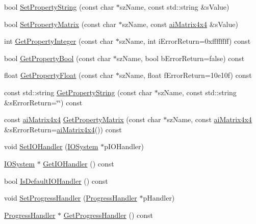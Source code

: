 \begin{DoxyCompactItemize}
\item 
bool \hyperlink{class_assimp_1_1_importer_a854087b213981108e3e464cf4d293fed}{Set\-Property\-String} (const char $\ast$sz\-Name, const std\-::string \&s\-Value)
\item 
bool \hyperlink{class_assimp_1_1_importer_acd128e5fb5777ef238b8bd1454a9c3ad}{Set\-Property\-Matrix} (const char $\ast$sz\-Name, const \hyperlink{structai_matrix4x4}{ai\-Matrix4x4} \&s\-Value)
\item 
int \hyperlink{class_assimp_1_1_importer_a3e796a0758a9f10f13107f44c542ad41}{Get\-Property\-Integer} (const char $\ast$sz\-Name, int i\-Error\-Return=0xffffffff) const 
\item 
bool \hyperlink{class_assimp_1_1_importer_a90f5d35d25e5d2a0ef8bc0c6545b2010}{Get\-Property\-Bool} (const char $\ast$sz\-Name, bool b\-Error\-Return=false) const 
\item 
float \hyperlink{class_assimp_1_1_importer_a9a99a3467d6386ddcfbe2823f16b6640}{Get\-Property\-Float} (const char $\ast$sz\-Name, float f\-Error\-Return=10e10f) const 
\item 
const std\-::string \hyperlink{class_assimp_1_1_importer_aa31cc1aa8f83056fe097b149354ddfd3}{Get\-Property\-String} (const char $\ast$sz\-Name, const std\-::string \&s\-Error\-Return=\char`\"{}\char`\"{}) const 
\item 
const \hyperlink{structai_matrix4x4}{ai\-Matrix4x4} \hyperlink{class_assimp_1_1_importer_a1b2e36eab7155233846b24ec30e7e273}{Get\-Property\-Matrix} (const char $\ast$sz\-Name, const \hyperlink{structai_matrix4x4}{ai\-Matrix4x4} \&s\-Error\-Return=\hyperlink{structai_matrix4x4}{ai\-Matrix4x4}()) const 
\item 
void \hyperlink{class_assimp_1_1_importer_a1161f46318af18bb86dfe0fc3edea4df}{Set\-I\-O\-Handler} (\hyperlink{class_assimp_1_1_i_o_system}{I\-O\-System} $\ast$p\-I\-O\-Handler)
\item 
\hyperlink{class_assimp_1_1_i_o_system}{I\-O\-System} $\ast$ \hyperlink{class_assimp_1_1_importer_abe3af30f4c5eae2e875b0f32068be44d}{Get\-I\-O\-Handler} () const 
\item 
bool \hyperlink{class_assimp_1_1_importer_ae3f26466cf7756594216ffedbc247563}{Is\-Default\-I\-O\-Handler} () const 
\item 
void \hyperlink{class_assimp_1_1_importer_a6a4d830ffb3f77a3c7c919e0af006920}{Set\-Progress\-Handler} (\hyperlink{class_assimp_1_1_progress_handler}{Progress\-Handler} $\ast$p\-Handler)
\item 
\hyperlink{class_assimp_1_1_progress_handler}{Progress\-Handler} $\ast$ \hyperlink{class_assimp_1_1_importer_a1fa669f0edc504fdf9178e8e22c728ad}{Get\-Progress\-Handler} () const 

\end{DoxyCompactItemize}
